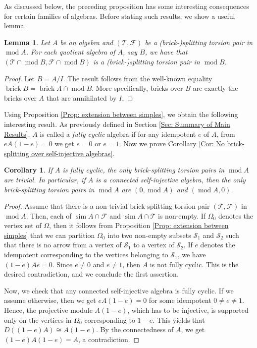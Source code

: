 \documentclass{amsart}
\theoremstyle{thmstyle}
\newtheorem{lemma}[thm]{Lemma}
\newtheorem{corollary}[thm]{Corollary}
\theoremstyle{exstyle}
\theoremstyle{defstyle}
\theoremstyle{remstyle}
\theoremstyle{remstyle}
\DeclareMathOperator*{\modu}{mod}
\DeclareMathOperator*{\brick}{brick}
\DeclareMathOperator*{\simp}{sim}
\begin{document}
As discussed below, the preceding proposition has some interesting consequences for certain families of algebras. Before stating such results, we show a useful lemma.

\begin{lemma}
Let $A$ be an algebra and $(\mathcal{T},\mathcal{F})$ be a (brick-)splitting torsion pair in $\modu A$. For each quotient algebra of $A$, say $B$, we have that $(\mathcal{T}\cap \modu B,\mathcal{F}\cap \modu B)$ is a (brick-)splitting torsion pair in $\modu B$.
\end{lemma}
\begin{proof}
Let $B = A/I$. The result follows from the well-known equality $\brick B = \brick A \cap \modu B$. More specifically, bricks over $B$ are exactly the bricks over $A$ that are annihilated by $I$.
\end{proof}

Using Proposition \ref{Prop: extension between simples}, we obtain the following interesting result. As previously defined in Section \ref{Sec: Summary of Main Results}, $A$ is called a \emph{fully cyclic} algebra if for any idempotent $e$ of $A$, from $eA(1-e)=0$ we get $e=0$ or $e=1$. 
Now we prove Corollary \ref{Cor: No brick-splitting over self-injective algebras}.

\begin{corollary}\label{Cor: fully cyclic and self-injective}
If $A$ is fully cyclic, the only brick-splitting torsion pairs in $\modu A$ are trivial. In particular, if $A$ is a connected self-injective algebra, then the only brick-splitting torsion pairs in $\modu A$ are $(0,\modu A)$ and $(\modu A, 0)$.
\end{corollary}

\begin{proof}
Assume that there is a non-trivial brick-splitting torsion pair $(\mathcal{T}, \mathcal{F})$ in $\modu A$. Then, each of $\simp A \cap \mathcal{F}$ and $\simp A \cap \mathcal{T}$ is non-empty. 
If $\Omega_0$ denotes the vertex set of $\Omega$, then it follows from Proposition \ref{Prop: extension between simples} that we can partition $\Omega_0$ into two non-empty subsets $\mathcal{S}_1$ and $\mathcal{S}_2$ such that there is no arrow from a vertex of $\mathcal{S}_1$ to a vertex of $\mathcal{S}_2$. If $e$ denotes the idempotent corresponding to the vertices belonging to $\mathcal{S}_1$, we have $(1-e)Ae=0$. Since $e\neq 0$ and $e\neq 1$, then $A$ is not fully cyclic. This is the desired contradiction, and we conclude the first assertion.

Now, we check that any connected self-injective algebra is fully cyclic. If we assume otherwise, then we get $eA(1-e)=0$ for some idempotent $0 \ne e \ne 1$. Hence, the projective module $A(1-e)$, which has to be injective, is supported only on the vertices in $\Omega_0$ corresponding to $1-e$. This yields that $D((1-e)A) \cong A(1-e)$. By the connectedness of $A$, we get $(1-e)A(1-e) = A$, a contradiction.
\end{proof}
\end{document}
